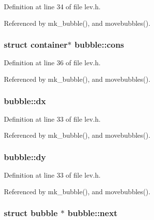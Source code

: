Definition at line 34 of file lev.\+h.



Referenced by mk\+\_\+bubble(), and movebubbles().

\hypertarget{structbubble_ac3bc5856e3a28ea2e9249acd52019757}{
\subsubsection[{cons}]{\setlength{\rightskip}{0pt plus 5cm}struct {\bf container}$\ast$ bubble\+::cons}}\label{structbubble_ac3bc5856e3a28ea2e9249acd52019757}


Definition at line 36 of file lev.\+h.



Referenced by mk\+\_\+bubble(), and movebubbles().

\hypertarget{structbubble_aef4c454d2300774393c58a14a5f78988}{
\subsubsection[{dx}]{ bubble\+::dx}}\label{structbubble_aef4c454d2300774393c58a14a5f78988}


Definition at line 33 of file lev.\+h.



Referenced by mk\+\_\+bubble(), and movebubbles().

\hypertarget{structbubble_ad0d5443c4c0c8774ee7acbb3a2a654b7}{
\subsubsection[{dy}]{ bubble\+::dy}}\label{structbubble_ad0d5443c4c0c8774ee7acbb3a2a654b7}


Definition at line 33 of file lev.\+h.



Referenced by mk\+\_\+bubble(), and movebubbles().

\hypertarget{structbubble_aef7d34c1e66aa80b038a11a71a06898b}{
\subsubsection[{next}]{\setlength{\rightskip}{0pt plus 5cm}struct {\bf bubble} $\ast$ bubble\+::next}}\label{structbubble_aef7d34c1e66aa80b038a11a71a06898b}



